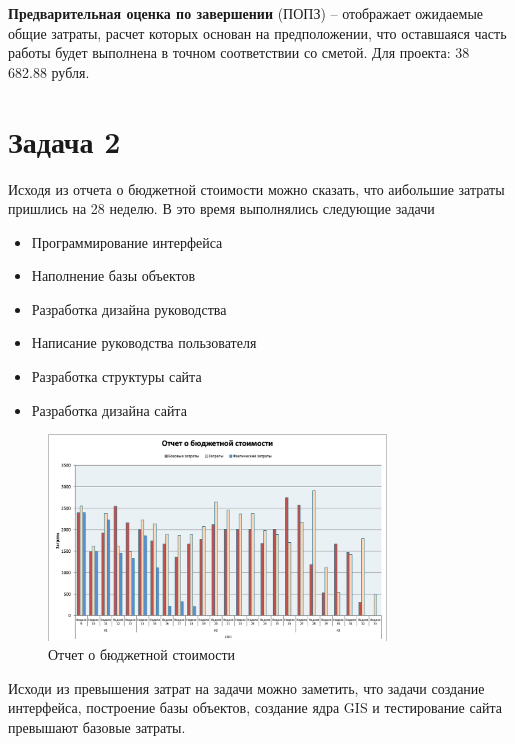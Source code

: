 \textbf{Предварительная оценка по завершении} (ПОПЗ) -- отображает ожидаемые общие затраты, расчет которых основан на предположении, что оставшаяся часть работы будет выполнена в точном соответствии со сметой. Для проекта: 38 682.88 рубля.

\section{Задача 2}

Исходя из отчета о бюджетной стоимости можно сказать, что аибольшие затраты пришлись на 28 неделю. В это время выполнялись следующие задачи

\begin{itemize}
    \item Программирование интерфейса
    \item Наполнение базы объектов
    \item Разработка дизайна руководства
    \item Написание руководства пользователя
    \item Разработка структуры сайта
    \item Разработка дизайна сайта
\end{itemize}

\begin{figure}[H]
    \centering
    \includegraphics[width=0.8\textwidth]{img/content/task_02_1.png}
    \caption{Отчет о бюджетной стоимости}
    \label{fig:task_02_1}
\end{figure}

Исходи из превышения затрат на задачи можно заметить, что задачи создание интерфейса, построение базы объектов, создание ядра GIS и тестирование сайта превышают базовые затраты.

